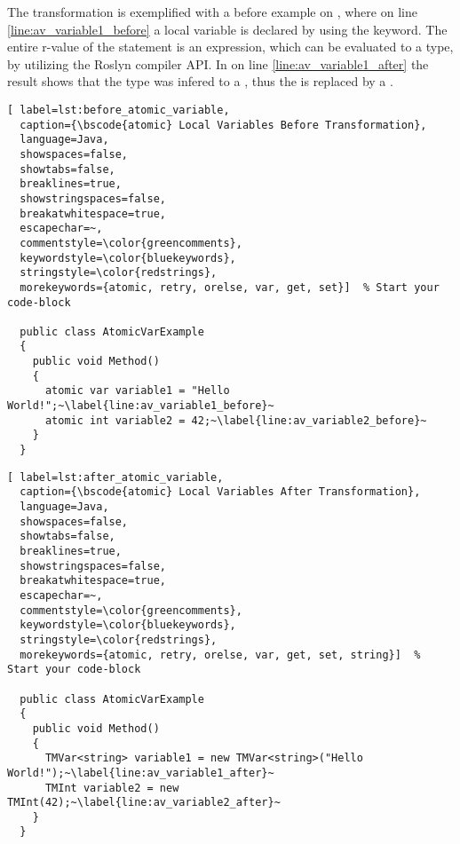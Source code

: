 The transformation is exemplified with a before example on , where on line \ref{line:av_variable1_before} a local variable is declared by using the  keyword. The entire r-value of the statement is an expression, which can be evaluated to a type, by utilizing the Roslyn compiler \ac{API}. In  on line  \ref{line:av_variable1_after} the result shows that the type was infered to a , thus the  is replaced by a .

\begin{lstlisting}[ label=lst:before_atomic_variable,
  caption={\bscode{atomic} Local Variables Before Transformation},
  language=Java,  
  showspaces=false,
  showtabs=false,
  breaklines=true,
  showstringspaces=false,
  breakatwhitespace=true,
  escapechar=~,
  commentstyle=\color{greencomments},
  keywordstyle=\color{bluekeywords},
  stringstyle=\color{redstrings},
  morekeywords={atomic, retry, orelse, var, get, set}]  % Start your code-block

  public class AtomicVarExample
  {
    public void Method()
    {
      atomic var variable1 = "Hello World!";~\label{line:av_variable1_before}~
      atomic int variable2 = 42;~\label{line:av_variable2_before}~
    }
  }
\end{lstlisting}

\begin{lstlisting}[ label=lst:after_atomic_variable,
  caption={\bscode{atomic} Local Variables After Transformation},
  language=Java,  
  showspaces=false,
  showtabs=false,
  breaklines=true,
  showstringspaces=false,
  breakatwhitespace=true,
  escapechar=~,
  commentstyle=\color{greencomments},
  keywordstyle=\color{bluekeywords},
  stringstyle=\color{redstrings},
  morekeywords={atomic, retry, orelse, var, get, set, string}]  % Start your code-block

  public class AtomicVarExample
  {
    public void Method()
    {
      TMVar<string> variable1 = new TMVar<string>("Hello World!");~\label{line:av_variable1_after}~
      TMInt variable2 = new TMInt(42);~\label{line:av_variable2_after}~
    }
  }
\end{lstlisting}


